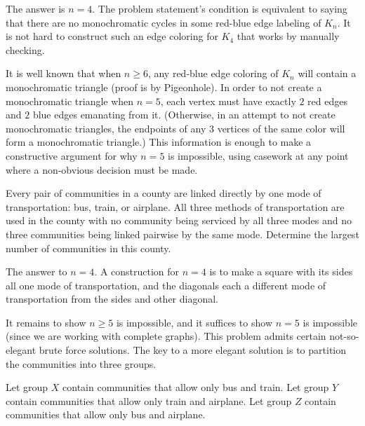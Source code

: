 \documentclass[11pt]{scrartcl}
\providecommand{\printpuid}[1]{\marginpar{\href{https://otis.evanchen.cc/arch/#1}{\ttfamily\footnotesize\color{green!40!black}#1}}}
\begin{document}
The answer is $n=4$.
The problem statement's condition is equivalent to saying that there are no monochromatic cycles in some red-blue edge labeling of $K_n$.
It is not hard to construct such an edge coloring for $K_4$ that works by manually checking.

It is well known that when $n \geq 6$, any red-blue edge coloring of $K_n$ will contain a monochromatic triangle (proof is by Pigeonhole).
In order to not create a monochromatic triangle when $n=5$, each vertex must have exactly $2$ red edges and $2$ blue edges emanating from it.
(Otherwise, in an attempt to not create monochromatic triangles, the endpoints of any $3$ vertices of the same color will form a monochromatic triangle.)
This information is enough to make a constructive argument for why $n=5$ is impossible, using casework at any point where a non-obvious decision must be made.

\begin{problem}
  Every pair of communities in a county are linked directly
  by one mode of transportation: bus, train, or airplane.
  All three methods of transportation are used in the county
  with no community being serviced by all three modes
  and no three communities being linked pairwise by the same mode.
  Determine the largest number of communities in this county.
\end{problem} \printpuid{81AMO2}

The answer to $n=4$.
A construction for $n=4$ is to make a square with its sides all one mode of transportation, and the diagonals each a different mode of transportation from the sides and other diagonal.

It remains to show $n \geq 5$ is impossible, and it suffices to show $n=5$ is impossible (since we are working with complete graphs).
This problem admits certain not-so-elegant brute force solutions.
The key to a more elegant solution is to partition the communities into three groups.

Let group $X$ contain communities that allow only bus and train.
Let group $Y$ contain communities that allow only train and airplane.
Let group $Z$ contain communities that allow only bus and airplane.
\end{document}

